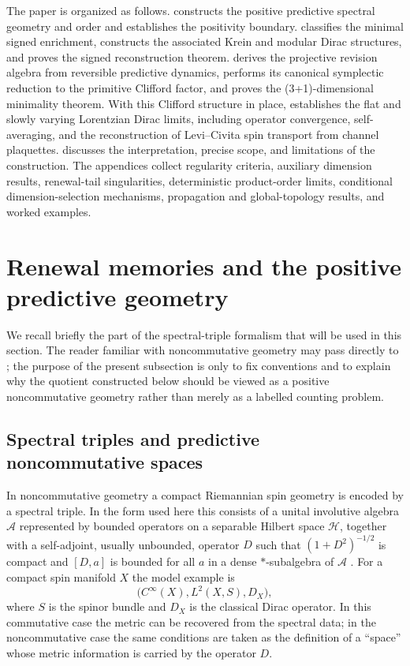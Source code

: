 \documentclass[11pt]{article}
\theoremstyle{definition}
\theoremstyle{remark}
\newcommand{\A}{\mathcal{A}}
\newcommand{\Hh}{\mathcal{H}}
\begin{document}
The paper is organized as follows.   constructs the positive
predictive spectral geometry and order and establishes the positivity
boundary.   classifies the minimal signed enrichment,
constructs the associated Krein and modular Dirac structures, and proves the
signed reconstruction theorem.  
derives the projective revision algebra from reversible predictive dynamics,
performs its canonical symplectic reduction to the primitive Clifford factor,
and proves the (3+1)-dimensional minimality theorem.  With this Clifford
structure in place,  establishes the flat and slowly
varying Lorentzian Dirac limits, including operator convergence,
self-averaging, and the reconstruction of Levi--Civita spin transport from
channel plaquettes.   discusses the
interpretation, precise scope, and limitations of the construction.  The
appendices collect regularity criteria, auxiliary dimension results,
renewal-tail singularities, deterministic product-order limits, conditional
dimension-selection mechanisms, propagation and global-topology results, and
worked examples.




 



\section{Renewal memories and the positive predictive geometry}
\label{sec:object}


We recall briefly the part of the spectral-triple formalism that will be used in
this section.  The reader familiar with noncommutative geometry may pass directly
to ; the purpose of the present subsection is only
to fix conventions and to explain why the quotient constructed below should be
viewed as a positive noncommutative geometry rather than merely as a labelled
counting problem.

\subsection{Spectral triples and predictive noncommutative spaces}
\label{subsec:spectral-background}

In noncommutative geometry a compact Riemannian spin geometry is encoded by a
spectral triple.  In the form used here this consists of a unital involutive
algebra $\A$ represented by bounded operators on a separable Hilbert space
$\Hh$, together with a self-adjoint, usually unbounded, operator $D$ such that
$(1+D^2)^{-1/2}$ is compact and $[D,a]$ is bounded for all $a$ in a dense
$*$-subalgebra of $\A$ \cite{connes}.  For a compact spin manifold $X$ the model
example is
\[
   \bigl(C^\infty(X),L^2(X,S),D_X\bigr),
\]
where $S$ is the spinor bundle and $D_X$ is the classical Dirac operator.  In
this commutative case the metric can be recovered from the spectral data; in the
noncommutative case the same conditions are taken as the definition of a
``space'' whose metric information is carried by the operator $D$.
\end{document}
